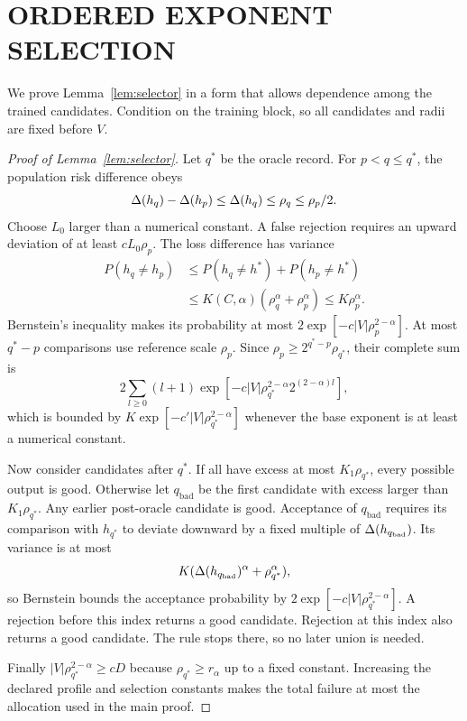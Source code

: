 \section{ORDERED EXPONENT SELECTION}
\label{app:selector}

We prove Lemma~\ref{lem:selector} in a form that allows dependence among the trained candidates. Condition on the training block, so all candidates and radii are fixed before $V$.

\begin{proof}[Proof of Lemma~\ref{lem:selector}]
Let $q^*$ be the oracle record. For $p<q\leq q^*$, the population risk difference obeys
\[
 \Delta(h_q)-\Delta(h_p)\leq\Delta(h_q)
 \leq\rho_q\leq\rho_p/2.
\]
Choose $L_0$ larger than a numerical constant. A false rejection requires an upward deviation of at least $cL_0\rho_p$. The loss difference has variance
\begin{align*}
 P(h_q\ne h_p)
 &\leq P(h_q\ne h^*)+P(h_p\ne h^*) \\
 &\leq K(C,\alpha)(\rho_q^\alpha+\rho_p^\alpha)
 \leq K\rho_p^\alpha.
\end{align*}
Bernstein's inequality makes its probability at most $2\exp[-c|V|\rho_p^{2-\alpha}]$. At most $q^*-p$ comparisons use reference scale $\rho_p$. Since $\rho_p\geq2^{q^*-p}\rho_{q^*}$, their complete sum is
\[
 2\sum_{l\geq0}(l+1)
 \exp[-c|V|\rho_{q^*}^{2-\alpha}2^{(2-\alpha)l}],
\]
which is bounded by $K\exp[-c'|V|\rho_{q^*}^{2-\alpha}]$ whenever the base exponent is at least a numerical constant.

Now consider candidates after $q^*$. If all have excess at most $K_1\rho_{q^*}$, every possible output is good. Otherwise let $q_{\mathrm{bad}}$ be the first candidate with excess larger than $K_1\rho_{q^*}$. Any earlier post-oracle candidate is good. Acceptance of $q_{\mathrm{bad}}$ requires its comparison with $h_{q^*}$ to deviate downward by a fixed multiple of $\Delta(h_{q_{\mathrm{bad}}})$. Its variance is at most
\[
 K(\Delta(h_{q_{\mathrm{bad}}})^\alpha+\rho_{q^*}^\alpha),
\]
so Bernstein bounds the acceptance probability by $2\exp[-c|V|\rho_{q^*}^{2-\alpha}]$. A rejection before this index returns a good candidate. Rejection at this index also returns a good candidate. The rule stops there, so no later union is needed.

Finally $|V|\rho_{q^*}^{2-\alpha}\geq cD$ because $\rho_{q^*}\geq r_\alpha$ up to a fixed constant. Increasing the declared profile and selection constants makes the total failure at most the allocation used in the main proof.
\end{proof}

